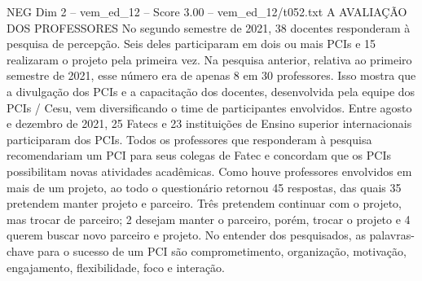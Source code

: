 \begin{textsample}{NEG Dim 2 – vem\_ed\_12 – Score 3.00 – vem\_ed\_12/t052.txt}  \label{ex:f2_neg_075}
A AVALIAÇÃO DOS PROFESSORES No segundo semestre de 2021, 38 docentes responderam à pesquisa de percepção.
Seis deles participaram em dois ou mais PCIs e 15 realizaram o projeto pela primeira vez.
Na pesquisa anterior, relativa ao primeiro semestre de 2021, esse número era de apenas 8 em 30 professores.
Isso mostra que a divulgação dos PCIs e a capacitação dos docentes, desenvolvida pela equipe dos PCIs / Cesu, vem diversificando o time de participantes envolvidos.
Entre agosto e dezembro de 2021, 25 Fatecs e 23 instituições de Ensino superior internacionais participaram dos PCIs.
Todos os professores que responderam à pesquisa recomendariam um PCI para seus colegas de Fatec e concordam que os PCIs possibilitam novas atividades acadêmicas.
Como houve professores envolvidos em mais de um projeto, ao todo o questionário retornou 45 respostas, das quais 35 pretendem manter projeto e parceiro.
Três pretendem continuar com o projeto, mas trocar de parceiro; 2 desejam manter o parceiro, porém, trocar o projeto e 4 querem buscar novo parceiro e projeto.
No entender dos pesquisados, as palavras-chave para o sucesso de um PCI são comprometimento, organização, motivação, engajamento, flexibilidade, foco e interação.

\end{textsample}

